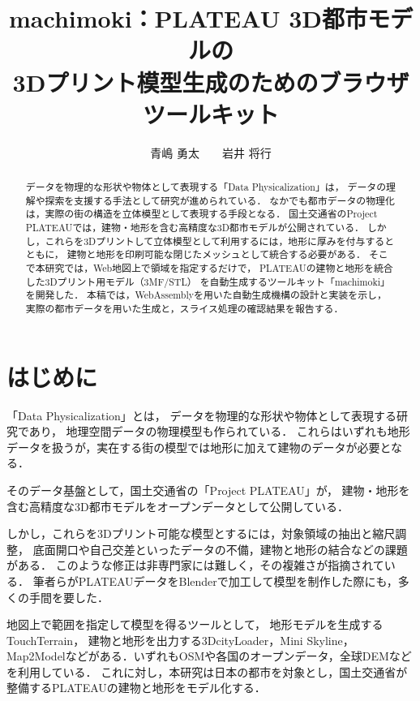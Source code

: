\documentclass[twoside]{wiss}
\begin{document}
\title{machimoki：PLATEAU 3D都市モデルの\\ 3Dプリント模型生成のためのブラウザツールキット}
\etitle{}
\author{青嶋 勇太　　岩井 将行}

\begin{abstract}
	データを物理的な形状や物体として表現する「Data Physicalization」は，
	データの理解や探索を支援する手法として研究が進められている．
	なかでも都市データの物理化は，実際の街の構造を立体模型として表現する手段となる．
	国土交通省のProject PLATEAUでは，建物・地形を含む高精度な3D都市モデルが公開されている．
	しかし，これらを3Dプリントして立体模型として利用するには，地形に厚みを付与するとともに，
	建物と地形を印刷可能な閉じたメッシュとして統合する必要がある．
	そこで本研究では，Web地図上で領域を指定するだけで，
	PLATEAUの建物と地形を統合した3Dプリント用モデル（3MF/STL）
	を自動生成するツールキット「machimoki」を開発した．
	本稿では，WebAssemblyを用いた自動生成機構の設計と実装を示し，
	実際の都市データを用いた生成と，スライス処理の確認結果を報告する．
\end{abstract}

\maketitle

\section{はじめに}
「Data Physicalization」\cite{jansen2015}とは，
データを物理的な形状や物体として表現する研究であり，
地理空間データの物理模型\cite{herman2025,millar2018}も作られている．
これらはいずれも地形データを扱うが，実在する街の模型では地形に加えて建物のデータが必要となる．

そのデータ基盤として，国土交通省の「Project PLATEAU」\cite{plateau}が，
建物・地形を含む高精度な3D都市モデルをオープンデータとして公開している．

しかし，これらを3Dプリント可能な模型とするには，対象領域の抽出と縮尺調整，
底面開口や自己交差といったデータの不備，建物と地形の結合などの課題がある．
このような修正は非専門家には難しく，その複雑さが指摘されている\cite{martial2026}．
筆者らがPLATEAUデータをBlenderで加工して模型を制作した際にも，多くの手間を要した．

地図上で範囲を指定して模型を得るツールとして，
地形モデルを生成するTouchTerrain\cite{hasiuk2017}，
建物と地形を出力する3DcityLoader\cite{3dcityloader}，Mini Skyline\cite{miniskyline}，
Map2Model\cite{map2model}などがある．いずれもOSMや各国のオープンデータ，全球DEMなどを利用している．
これに対し，本研究は日本の都市を対象とし，国土交通省が整備するPLATEAUの建物と地形をモデル化する．
\end{document}
